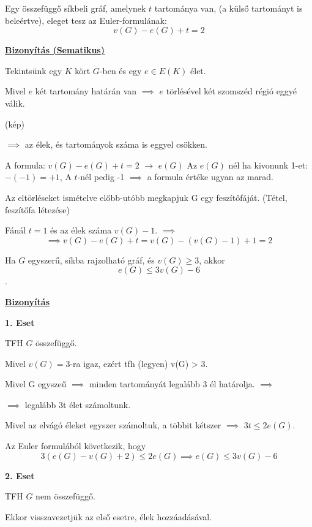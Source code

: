 \documentclass[10pt]{article}
\renewcommand{\\}{\par\noindent}
\begin{document}
\begin{frame}

\begin{tcolorbox}[title={Tétel: Euler formula}]
Egy összefüggő síkbeli gráf, amelynek $t$ tartománya van, (a külső tartományt is beleértve), eleget tesz az Euler-formulának:
$$v(G) - e(G) + t = 2$$\\
\tcblower
\smallskip
\underline{\textbf{Bizonyítás (Sematikus)}}\\
\medskip
Tekintsünk egy $K$ kört $G$-ben és egy $e \in E(K)$ élet.\\
Mivel $e$ két tartomány határán van $\implies$ $e$ törlésével két szomszéd régió eggyé válik.

(kép)

$\implies$ az élek, és tartományok száma is eggyel csökken.\\
A formula: $v(G) - e(G) + t = 2$ $\rightarrow$ $e(G)$ Az $e(G)$ nél ha kivonunk 1-et: $-(-1) = +1$, A $t$-nél pedig -1 $\implies$ a formula értéke ugyan az marad.\\

Az eltörléseket ismételve előbb-utóbb megkapjuk G egy feszítőfáját. (Tétel, feszítőfa létezése)

Fánál $t = 1$ és az élek száma $v(G) - 1$. $\implies$
$$\implies v(G) - e(G) + t = v(G) - (v(G) - 1) + 1 = 2$$

\end{tcolorbox}
\end{frame}

\begin{frame}
\begin{tcolorbox}[title={Tétel: Síkgráf élszáma}]
Ha $G$ egyszerű, síkba rajzolható gráf, és $v(G) \geq 3$, akkor $$e(G) \leq 3v(G) - 6$$.\\
\tcblower
\smallskip
\underline{\textbf{Bizonyítás}}\\
\medskip
\\
\textbf{1. Eset}\\
TFH $G$ összefüggő.\\
Mivel $v(G) = 3$-ra igaz, ezért tfh (legyen) v(G) > 3.\\
Mivel G egyszeű $\implies$ minden tartományát legalább 3 él határolja. $\implies$\\
$\implies$ legalább 3t élet számoltunk.\\
Mivel az elvágó éleket egyszer számoltuk, a többit kétszer $\implies$ $3t \leq 2e(G)$.\\
Az Euler formulából következik, hogy $$3(e(G) - v(G) + 2) \leq 2e(G) \implies e(G) \leq 3v(G) - 6$$\\
\smallskip
\textbf{2. Eset}\\
TFH $G$ nem összefüggő.\\
Ekkor visszavezetjük az első esetre, élek hozzáadásával.

\end{tcolorbox}

\end{frame}
\end{document}
